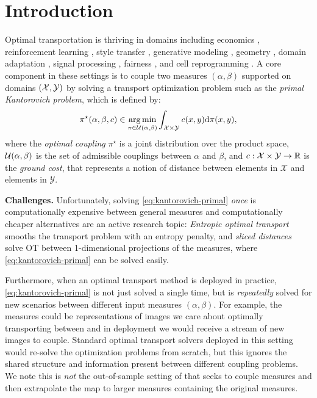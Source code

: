 \documentclass{article}
\begin{document}
\section{Introduction}
Optimal transportation \citep{villani2009optimal,ambrosio2003lecture,santambrogio2015optimal,peyre2019computational,merigot2021optimal} is thriving in domains including
economics \citep{galichon2016optimal},
reinforcement learning \citep{dadashi2020primal,fickinger2021cross},
style transfer \citep{kolkin2019style},
generative modeling \citep{arjovsky2017wasserstein,seguy2017large,huang2020convex,rout2021generative},
geometry \citep{solomon2015convolutional,cohen2021riemannian},
domain adaptation \citep{courty2017joint,redko2019optimal},
signal processing \citep{kolouri2017optimal},
fairness \citep{jiang2020wasserstein}, and cell reprogramming \citep{SCHIEBINGER2019928}.
A core component in these settings is to couple two
measures $(\alpha,\beta)$ supported on domains $({\mathcal{X}}, {\mathcal{Y}})$
by solving a transport optimization problem such as the
\emph{primal Kantorovich problem}, which is defined by:
\begin{equation}
  \pi^\star(\alpha, \beta, c)\in \operatorname*{arg\,min}_{\pi\in{\mathcal{U}}(\alpha, \beta)}
    \int_{{\mathcal{X}}\times {\mathcal{Y}}} c(x,y){\rm d}\pi(x,y),
  \label{eq:kantorovich-primal}
\end{equation}
where the \emph{optimal coupling} $\pi^\star$
is a joint distribution over the  product space,
${\mathcal{U}}(\alpha, \beta)$ is the set of admissible couplings
between $\alpha$ and $\beta$, and
$c: {\mathcal{X}}\times{\mathcal{Y}} \rightarrow \mathbb{R}$ is the \emph{ground cost}, that represents a notion of distance between elements in $\mathcal{X}$ and elements in $\mathcal{Y}$.

\textbf{Challenges.}
Unfortunately, solving \cref{eq:kantorovich-primal} \emph{once} is
computationally expensive between general measures  and
computationally cheaper alternatives are an active research topic:
\emph{Entropic optimal transport} \citep{cuturi2013sinkhorn}
smooths the transport problem with an entropy penalty, and
\emph{sliced distances}
\citep{kolouri2016sliced,kolouri2018sliced,kolouri2019generalized,deshpande2019max}
solve OT between 1-dimensional projections of the measures,
where \cref{eq:kantorovich-primal} can be solved easily.

Furthermore, when an optimal transport method is deployed
in practice, \cref{eq:kantorovich-primal} is not just solved a
single time, but is \emph{repeatedly} solved for new
scenarios between different input measures $(\alpha, \beta)$.
For example, the measures could be representations of images
we care about optimally transporting between and in deployment
we would receive a stream of new images to couple.
Standard optimal transport solvers deployed in this
setting would re-solve the optimization problems from
scratch, but this ignores the shared structure and
information present between different coupling problems.
We note this is \emph{not} the out-of-sample setting
of \citet{seguy2017large,perrot2016mapping} that
seeks to couple measures and then extrapolate the map to
larger measures containing the original measures.
\end{document}
